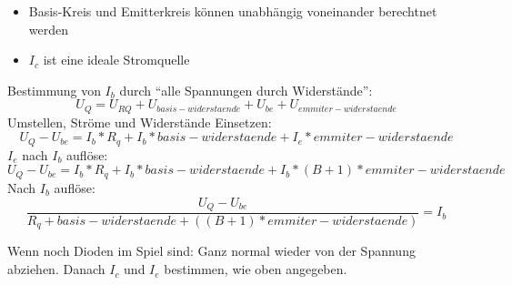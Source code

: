 \begin{itemize}
\item Basis-Kreis und Emitterkreis können unabhängig voneinander berechtnet werden
\item $I_{c}$ ist eine ideale Stromquelle
\end{itemize}
Bestimmung von $I_b$ durch "`alle Spannungen durch Widerstände"':
\[U_Q = U_{RQ} + U_{basis-widerstaende} + U_{be} + U_{emmiter-widerstaende}\]
Umstellen, Ströme und Widerstände Einsetzen:
\[U_Q - U_{be} = I_b * R_q + I_b * basis-widerstaende + I_e * emmiter-widerstaende\]
$I_e$ nach $I_b$ auflöse:
\[U_Q - U_{be} = I_b * R_q + I_b * basis-widerstaende + I_b * (B+1) * emmiter-widerstaende\]
Nach $I_b$ auflöse:
\[\frac{U_Q - U_{be}}{R_q + basis-widerstaende + ((B+1) * emmiter-widerstaende)} = I_b\]

Wenn noch Dioden im Spiel sind: Ganz normal wieder von der Spannung abziehen.
Danach $I_{c}$  und $I_{e}$ bestimmen, wie oben angegeben.
